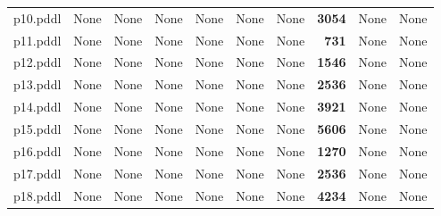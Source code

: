 \documentclass{article}
\begin{document}
\begin{tabular}{@{}lrrrrrrrrr@{}}
p10.pddl & \multicolumn{1}{|l|}{None} & \multicolumn{1}{|l|}{None} & \multicolumn{1}{|l|}{None} & \multicolumn{1}{|l|}{None} & \multicolumn{1}{|l|}{None} & \multicolumn{1}{|l|}{None} & \textbf{3054} & \multicolumn{1}{|l|}{None} & \multicolumn{1}{|l|}{None} \\
p11.pddl & \multicolumn{1}{|l|}{None} & \multicolumn{1}{|l|}{None} & \multicolumn{1}{|l|}{None} & \multicolumn{1}{|l|}{None} & \multicolumn{1}{|l|}{None} & \multicolumn{1}{|l|}{None} & \textbf{731} & \multicolumn{1}{|l|}{None} & \multicolumn{1}{|l|}{None} \\
p12.pddl & \multicolumn{1}{|l|}{None} & \multicolumn{1}{|l|}{None} & \multicolumn{1}{|l|}{None} & \multicolumn{1}{|l|}{None} & \multicolumn{1}{|l|}{None} & \multicolumn{1}{|l|}{None} & \textbf{1546} & \multicolumn{1}{|l|}{None} & \multicolumn{1}{|l|}{None} \\
p13.pddl & \multicolumn{1}{|l|}{None} & \multicolumn{1}{|l|}{None} & \multicolumn{1}{|l|}{None} & \multicolumn{1}{|l|}{None} & \multicolumn{1}{|l|}{None} & \multicolumn{1}{|l|}{None} & \textbf{2536} & \multicolumn{1}{|l|}{None} & \multicolumn{1}{|l|}{None} \\
p14.pddl & \multicolumn{1}{|l|}{None} & \multicolumn{1}{|l|}{None} & \multicolumn{1}{|l|}{None} & \multicolumn{1}{|l|}{None} & \multicolumn{1}{|l|}{None} & \multicolumn{1}{|l|}{None} & \textbf{3921} & \multicolumn{1}{|l|}{None} & \multicolumn{1}{|l|}{None} \\
p15.pddl & \multicolumn{1}{|l|}{None} & \multicolumn{1}{|l|}{None} & \multicolumn{1}{|l|}{None} & \multicolumn{1}{|l|}{None} & \multicolumn{1}{|l|}{None} & \multicolumn{1}{|l|}{None} & \textbf{5606} & \multicolumn{1}{|l|}{None} & \multicolumn{1}{|l|}{None} \\
p16.pddl & \multicolumn{1}{|l|}{None} & \multicolumn{1}{|l|}{None} & \multicolumn{1}{|l|}{None} & \multicolumn{1}{|l|}{None} & \multicolumn{1}{|l|}{None} & \multicolumn{1}{|l|}{None} & \textbf{1270} & \multicolumn{1}{|l|}{None} & \multicolumn{1}{|l|}{None} \\
p17.pddl & \multicolumn{1}{|l|}{None} & \multicolumn{1}{|l|}{None} & \multicolumn{1}{|l|}{None} & \multicolumn{1}{|l|}{None} & \multicolumn{1}{|l|}{None} & \multicolumn{1}{|l|}{None} & \textbf{2536} & \multicolumn{1}{|l|}{None} & \multicolumn{1}{|l|}{None} \\
p18.pddl & \multicolumn{1}{|l|}{None} & \multicolumn{1}{|l|}{None} & \multicolumn{1}{|l|}{None} & \multicolumn{1}{|l|}{None} & \multicolumn{1}{|l|}{None} & \multicolumn{1}{|l|}{None} & \textbf{4234} & \multicolumn{1}{|l|}{None} & \multicolumn{1}{|l|}{None} \\

\end{tabular}
\end{document}

